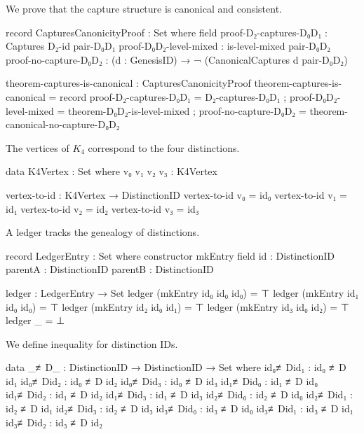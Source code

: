 \documentclass[11pt,a4paper]{book}
\begin{document}
We prove that the capture structure is canonical and consistent.

\begin{code}
record CapturesCanonicityProof : Set where
  field
    proof-D₂-captures-D₀D₁ : Captures D₂-id pair-D₀D₁
    proof-D₀D₂-level-mixed : is-level-mixed pair-D₀D₂
    proof-no-capture-D₀D₂  : (d : GenesisID) → ¬ (CanonicalCaptures d pair-D₀D₂)

theorem-captures-is-canonical : CapturesCanonicityProof
theorem-captures-is-canonical = record
  { proof-D₂-captures-D₀D₁ = D₂-captures-D₀D₁
  ; proof-D₀D₂-level-mixed = theorem-D₀D₂-is-level-mixed
  ; proof-no-capture-D₀D₂ = theorem-canonical-no-capture-D₀D₂
  }
\end{code}

The vertices of $K_4$ correspond to the four distinctions.

\begin{code}
data K4Vertex : Set where
  v₀ v₁ v₂ v₃ : K4Vertex

vertex-to-id : K4Vertex → DistinctionID
vertex-to-id v₀ = id₀
vertex-to-id v₁ = id₁
vertex-to-id v₂ = id₂
vertex-to-id v₃ = id₃
\end{code}

A ledger tracks the genealogy of distinctions.

\begin{code}
record LedgerEntry : Set where
  constructor mkEntry
  field
    id      : DistinctionID
    parentA : DistinctionID
    parentB : DistinctionID

ledger : LedgerEntry → Set
ledger (mkEntry id₀ id₀ id₀) = ⊤
ledger (mkEntry id₁ id₀ id₀) = ⊤
ledger (mkEntry id₂ id₀ id₁) = ⊤
ledger (mkEntry id₃ id₀ id₂) = ⊤
ledger _                     = ⊥
\end{code}

We define inequality for distinction IDs.

\begin{code}
data _≢D_ : DistinctionID → DistinctionID → Set where
  id₀≢Did₁ : id₀ ≢D id₁
  id₀≢Did₂ : id₀ ≢D id₂
  id₀≢Did₃ : id₀ ≢D id₃
  id₁≢Did₀ : id₁ ≢D id₀
  id₁≢Did₂ : id₁ ≢D id₂
  id₁≢Did₃ : id₁ ≢D id₃
  id₂≢Did₀ : id₂ ≢D id₀
  id₂≢Did₁ : id₂ ≢D id₁
  id₂≢Did₃ : id₂ ≢D id₃
  id₃≢Did₀ : id₃ ≢D id₀
  id₃≢Did₁ : id₃ ≢D id₁
  id₃≢Did₂ : id₃ ≢D id₂
\end{code}
\end{document}

